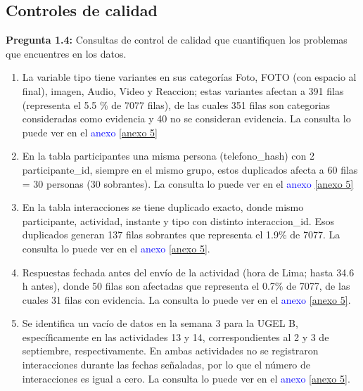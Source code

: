 \documentclass[12pt,a4paper]{article}
\begin{document}
		\subsection{Controles de calidad}
		
			\noindent \textbf{Pregunta 1.4:} Consultas de control de calidad que cuantifiquen los problemas que encuentres en 
			los datos. 
			
			\begin{enumerate}
				\item La variable tipo tiene variantes en sus categorías Foto, 
				      FOTO (con espacio al final), imagen, Audio, Video y Reaccion; estas variantes
				      afectan a 391 filas (representa el 5.5 \% de 7077 filas), de las cuales 351 filas son 
				      categorias consideradas como evidencia y 40 no se consideran evidencia.
				      La consulta lo puede ver en el \textcolor{blue}{anexo \ref{anexo 5}}            
				\item En la tabla participantes una misma persona (telefono\_hash) con 2 participante\_id, siempre
					  en el mismo grupo, estos duplicados afecta a 60 filas = 30 personas (30 sobrantes).
					  La consulta lo puede ver en el \textcolor{blue}{anexo \ref{anexo 5}}
				\item En la tabla interacciones se tiene duplicado exacto, donde mismo participante, actividad, instante y tipo con distinto
				      interaccion\_id. Esos duplicados generan 137 filas sobrantes que representa el 1.9\% de 7077.
				      La consulta lo puede ver en el \textcolor{blue}{anexo \ref{anexo 5}}.
				\item Respuestas fechada antes del envío de la actividad (hora de
				      Lima; hasta 34.6 h antes), donde 50 filas son afectadas que representa el 0.7\% de 7077, 
				      de las cuales 31 filas con evidencia. 
				      La consulta lo puede ver en el \textcolor{blue}{anexo \ref{anexo 5}}.
				\item Se identifica un vacío de datos en la semana 3 para la UGEL B, específicamente en las actividades 13
				      y 14, correspondientes al 2 y 3 de septiembre, respectivamente. En ambas actividades no se registraron
				      interacciones durante las fechas señaladas, por lo que el número de interacciones es igual a cero.
					  La consulta lo puede ver en el \textcolor{blue}{anexo \ref{anexo 5}}.
			\end{enumerate}

		
		
\end{document}
